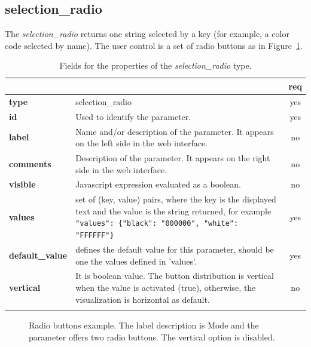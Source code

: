 \clearpage
\subsection{selection\_radio}

The \emph{selection\_radio} returns one string selected by a key (for example, a color code selected by name). The user control is a set of radio buttons as in Figure~\ref{fig:selection_radio_example}.

\begin{longtable}{|>{\bf}L{\linewidth}|L{\linewidth}|c|}
\hline
      &  & {\bf req} 
\tabularnewline \hline \hline
 type     & selection\_radio    & yes \\ \hline
 id     & Used to identify the parameter. & yes \\ \hline
 label  & Name and/or description of the parameter. It appears on the left side in the web interface. & no
                      \\ \hline
 comments & Description of the parameter. It appears on the right side in the web interface. & no
                      \\ \hline
 visible    & Javascript expression evaluated as a boolean.
            & no \\ \hline
 values   & set of (key, value) pairs, where the key is the displayed text and the 
value is the string returned, for example \texttt{"values": \{"black": "000000", "white": "FFFFFF"\}} & yes
                      \\ \hline
 default\_value & defines the default value for this parameter, should be one 
the values defined in 'values'. & yes \\ \hline
 vertical & It is boolean value. The button distribution is vertical when the value is activated (true), otherwise, the visualization is horizontal as default. & no \\ \hline
\caption{Fields for the properties of the \emph{selection\_radio} type.}
\end{longtable}

\begin{figure}[h]
\centering
{}
\caption{Radio buttons example. The label description is Mode and the parameter offers two radio buttons. The vertical option is disabled.}
\label{fig:selection_radio_example}
\end{figure}

